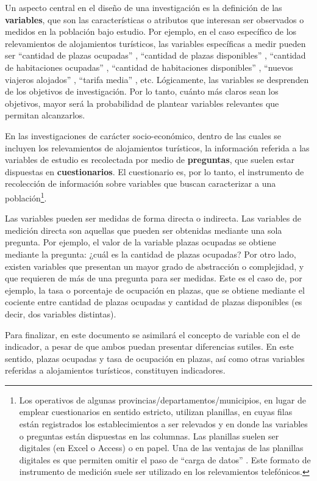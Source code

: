 \documentclass[
]{book}
\begin{document}
Un aspecto central en el diseño de una investigación es la definición de las \textbf{variables}, que son las características o atributos que interesan ser observados o medidos en la población bajo estudio. Por ejemplo, en el caso específico de los relevamientos de alojamientos turísticos, las variables específicas a medir pueden ser ``cantidad de plazas ocupadas'' , ``cantidad de plazas disponibles'' , ``cantidad de habitaciones ocupadas'' , ``cantidad de habitaciones disponibles'' , ``nuevos viajeros alojados'' , ``tarifa media'' , etc. Lógicamente, las variables se desprenden de los objetivos de investigación. Por lo tanto, cuánto más claros sean los objetivos, mayor será la probabilidad de plantear variables relevantes que permitan alcanzarlos.

En las investigaciones de carácter socio-económico, dentro de las cuales se incluyen los relevamientos de alojamientos turísticos, la información referida a las variables de estudio es recolectada por medio de \textbf{preguntas}, que suelen estar dispuestas en \textbf{cuestionarios}. El cuestionario es, por lo tanto, el instrumento de recolección de información sobre variables que buscan caracterizar a una población\footnote{Los operativos de algunas provincias/departamentos/municipios, en lugar de emplear cuestionarios en sentido estricto, utilizan planillas, en cuyas filas están registrados los establecimientos a ser relevados y en donde las variables o preguntas están dispuestas en las columnas. Las planillas suelen ser digitales (en Excel o Access) o en papel. Una de las ventajas de las planillas digitales es que permiten omitir el paso de ``carga de datos'' . Este formato de instrumento de medición suele ser utilizado en los relevamientos telefónicos.}.

Las variables pueden ser medidas de forma directa o indirecta. Las variables de medición directa son aquellas que pueden ser obtenidas mediante una sola pregunta. Por ejemplo, el valor de la variable plazas ocupadas se obtiene mediante la pregunta: ¿cuál es la cantidad de plazas ocupadas? Por otro lado, existen variables que presentan un mayor grado de abstracción o complejidad, y que requieren de más de una pregunta para ser medidas. Este es el caso de, por ejemplo, la tasa o porcentaje de ocupación en plazas, que se obtiene mediante el cociente entre cantidad de plazas ocupadas y cantidad de plazas disponibles (es decir, dos variables distintas).

Para finalizar, en este documento se asimilará el concepto de variable con el de indicador, a pesar de que ambos puedan presentar diferencias sutiles. En este sentido, plazas ocupadas y tasa de ocupación en plazas, así como otras variables referidas a alojamientos turísticos, constituyen indicadores.
\end{document}
